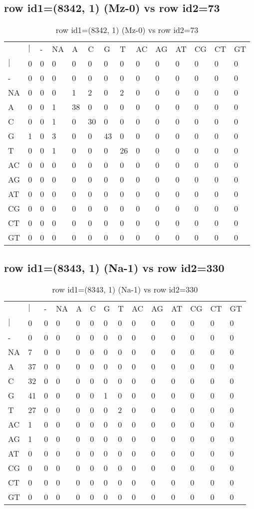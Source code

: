 \subsection{row id1=(8342, 1) (Mz-0) vs row id2=73}
\begin{center}
\begin{longtable}{|l|l|l|l|l|l|l|l|l|l|l|l|l|l|}
\caption{row id1=(8342, 1) (Mz-0) vs row id2=73} \label{table_dm350}\\
\hline
\\
\hline
&$|$&-&NA&A&C&G&T&AC&AG&AT&CG&CT&GT\\
$|$&0&0&0&0&0&0&0&0&0&0&0&0&0\\
-&0&0&0&0&0&0&0&0&0&0&0&0&0\\
NA&0&0&0&1&2&0&2&0&0&0&0&0&0\\
A&0&0&1&38&0&0&0&0&0&0&0&0&0\\
C&0&0&1&0&30&0&0&0&0&0&0&0&0\\
G&1&0&3&0&0&43&0&0&0&0&0&0&0\\
T&0&0&1&0&0&0&26&0&0&0&0&0&0\\
AC&0&0&0&0&0&0&0&0&0&0&0&0&0\\
AG&0&0&0&0&0&0&0&0&0&0&0&0&0\\
AT&0&0&0&0&0&0&0&0&0&0&0&0&0\\
CG&0&0&0&0&0&0&0&0&0&0&0&0&0\\
CT&0&0&0&0&0&0&0&0&0&0&0&0&0\\
GT&0&0&0&0&0&0&0&0&0&0&0&0&0\\
\hline
\end{longtable}
\end{center}

\subsection{row id1=(8343, 1) (Na-1) vs row id2=330}
\begin{center}
\begin{longtable}{|l|l|l|l|l|l|l|l|l|l|l|l|l|l|}
\caption{row id1=(8343, 1) (Na-1) vs row id2=330} \label{table_dm352}\\
\hline
\\
\hline
&$|$&-&NA&A&C&G&T&AC&AG&AT&CG&CT&GT\\
$|$&0&0&0&0&0&0&0&0&0&0&0&0&0\\
-&0&0&0&0&0&0&0&0&0&0&0&0&0\\
NA&7&0&0&0&0&0&0&0&0&0&0&0&0\\
A&37&0&0&0&0&0&0&0&0&0&0&0&0\\
C&32&0&0&0&0&0&0&0&0&0&0&0&0\\
G&41&0&0&0&0&1&0&0&0&0&0&0&0\\
T&27&0&0&0&0&0&2&0&0&0&0&0&0\\
AC&1&0&0&0&0&0&0&0&0&0&0&0&0\\
AG&1&0&0&0&0&0&0&0&0&0&0&0&0\\
AT&0&0&0&0&0&0&0&0&0&0&0&0&0\\
CG&0&0&0&0&0&0&0&0&0&0&0&0&0\\
CT&0&0&0&0&0&0&0&0&0&0&0&0&0\\
GT&0&0&0&0&0&0&0&0&0&0&0&0&0\\
\hline
\end{longtable}
\end{center}

